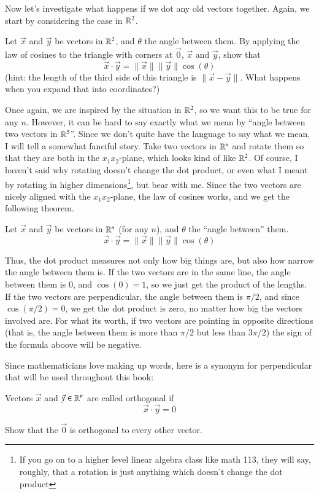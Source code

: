 \documentclass[Main.tex]{subfiles}
\begin{document}
Now let's investigate what happens if we dot any old vectors together.
Again, we start by considering the case in $\mathbb{R}^2$.
\begin{ImpEx}
  Let $\vec{x}$ and $\vec{y}$ be vectors in $\mathbb{R}^2$, and $\theta$ the angle between them.
  By applying the law of cosines to the triangle with corners at $\vec{0}$, $\vec{x}$ and $\vec{y}$, show that 
  \[\vec{x}\cdot\vec{y}=\|\vec{x}\|\|\vec{y}\|\cos(\theta)\]
  (hint: the length of the third side of this triangle is $\|\vec{x}-\vec{y}\|$.  What happens when you expand that into coordinates?)
\end{ImpEx}
Once again, we are inspired by the situation in $\mathbb{R}^2$, so we want this to be true for any $n$.
However, it can be hard to say exactly what we mean by ``angle between two vectors in $\mathbb{R}^5$''.
Since we don't quite have the language to say what we mean, I will tell a somewhat fanciful story.
Take two vectors in $\mathbb{R}^n$ and rotate them so that they are both in the $x_1x_2$-plane, which looks kind of like $\mathbb{R}^2$.
Of course, I haven't said why rotating doesn't change the dot product, or even what I meant by rotating in higher dimensions\footnote{If you go on to a higher level linear algebra class like math 113, they will say, roughly, that a rotation is just anything which doesn't change the dot product}, but bear with me.  
Since the two vectors are nicely aligned with the $x_1x_2$-plane, the law of cosines works, and we get the following theorem.  
\begin{Theorem}
  \label{sec:cosineform}
  Let $\vec{x}$ and $\vec{y}$ be vectors in $\mathbb{R}^n$ (for any $n$), and $\theta$ the ``angle between'' them.
  \[\vec{x}\cdot\vec{y}=\|\vec{x}\|\|\vec{y}\|\cos(\theta)\]
\end{Theorem}
Thus, the dot product measures not only how big things are, but also how narrow the angle between them is.
If the two vectors are in the same line, the angle between them is 0, and $\cos(0)=1$, so we just get the product of the lengths.
If the two vectors are perpendicular, the angle between them is $\pi/2$, and since $\cos(\pi/2)=0$, we get the dot product is zero, no matter how big the vectors involved are.
For what its worth, if two vectors are pointing in opposite directions (that is, the angle between them is more than $\pi/2$ but less than $3\pi/2$) the sign of the formula aboove will be negative.

Since mathematicians love making up words, here is a synonym for perpendicular that will be used throughout this book:
\begin{Def}[Orthogonal]
  Vectors $\vec{x}$ and $\vec{y}\in\mathbb{R}^n$ are called orthogonal if
  \[\vec{x}\cdot\vec{y}=0\]
\end{Def}
\begin{EasyEx}
  Show that the $\vec{0}$ is orthogonal to every other vector.
\end{EasyEx}
\end{document}
